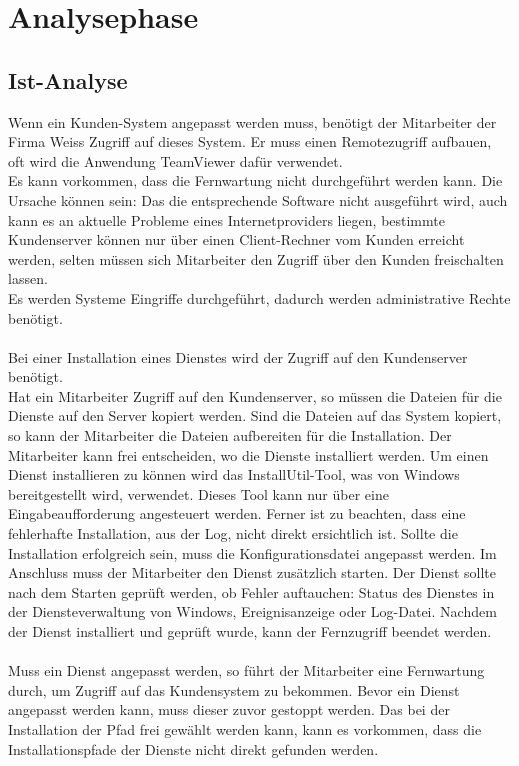 \section{Analysephase} 
\label{sec:Analysephase}


\subsection{Ist-Analyse} 
\label{sec:IstAnalyse}

Wenn ein Kunden-System angepasst werden muss, benötigt der Mitarbeiter der Firma Weiss Zugriff auf dieses System. Er muss einen Remotezugriff aufbauen, oft wird die Anwendung TeamViewer dafür verwendet.\\
Es kann vorkommen, dass die Fernwartung nicht durchgeführt werden kann. Die Ursache können sein: Das die entsprechende Software nicht ausgeführt wird, auch kann es an aktuelle Probleme eines Internetproviders liegen, bestimmte Kundenserver können nur über einen Client-Rechner vom Kunden erreicht werden, selten müssen sich Mitarbeiter den Zugriff über den Kunden freischalten lassen.\\
Es werden Systeme Eingriffe durchgeführt, dadurch werden administrative Rechte benötigt. \\
\\
Bei einer Installation eines Dienstes wird der Zugriff auf den Kundenserver benötigt.\\
Hat ein Mitarbeiter Zugriff auf den Kundenserver, so müssen die Dateien für die Dienste auf den Server kopiert werden.
Sind die Dateien auf das System kopiert, so kann der Mitarbeiter die Dateien aufbereiten für die Installation. Der Mitarbeiter kann frei entscheiden, wo die Dienste installiert werden. Um einen Dienst installieren zu können wird das InstallUtil-Tool, was von Windows bereitgestellt wird, verwendet. Dieses Tool kann nur über eine Eingabeaufforderung angesteuert werden. Ferner ist zu beachten, dass eine fehlerhafte Installation, aus der Log, nicht direkt ersichtlich ist. Sollte die Installation erfolgreich sein, muss die Konfigurationsdatei angepasst werden. Im Anschluss muss der Mitarbeiter den Dienst zusätzlich starten. Der Dienst sollte nach dem Starten geprüft werden, ob Fehler auftauchen: Status des Dienstes in der Diensteverwaltung von Windows, Ereignisanzeige oder Log-Datei. Nachdem der Dienst installiert und geprüft wurde, kann der Fernzugriff beendet werden.\\
\\
Muss ein Dienst angepasst werden, so führt der Mitarbeiter eine Fernwartung durch, um Zugriff auf das Kundensystem zu bekommen. Bevor ein Dienst angepasst werden kann, muss dieser zuvor gestoppt werden. Das bei der Installation der Pfad frei gewählt werden kann, kann es vorkommen, dass die Installationspfade der Dienste nicht direkt gefunden werden.\\
